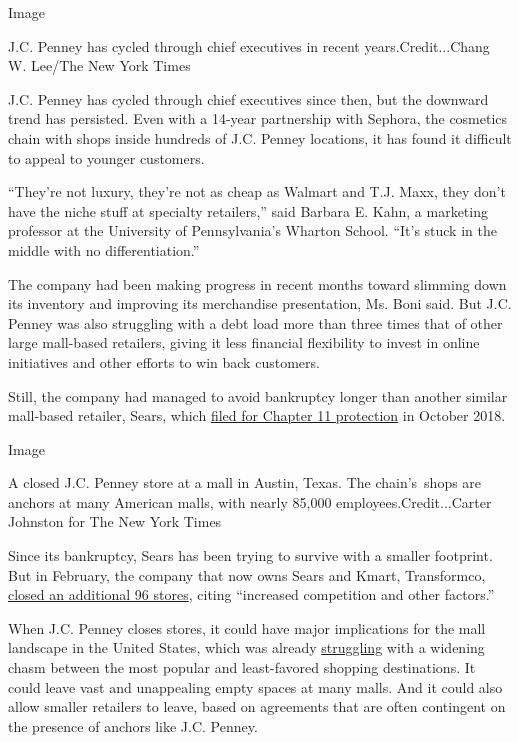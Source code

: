 Image

J.C. Penney has cycled through chief executives in recent
years.Credit...Chang W. Lee/The New York Times

J.C. Penney has cycled through chief executives since then, but the
downward trend has persisted. Even with a 14-year partnership with
Sephora, the cosmetics chain with shops inside hundreds of J.C. Penney
locations, it has found it difficult to appeal to younger customers.

``They're not luxury, they're not as cheap as Walmart and T.J. Maxx,
they don't have the niche stuff at specialty retailers,'' said Barbara
E. Kahn, a marketing professor at the University of Pennsylvania's
Wharton School. ``It's stuck in the middle with no differentiation.''

The company had been making progress in recent months toward slimming
down its inventory and improving its merchandise presentation, Ms. Boni
said. But J.C. Penney was also struggling with a debt load more than
three times that of other large mall-based retailers, giving it less
financial flexibility to invest in online initiatives and other efforts
to win back customers.

Still, the company had managed to avoid bankruptcy longer than another
similar mall-based retailer, Sears, which
\href{https://www.nytimes3xbfgragh.onion/2018/10/14/business/sears-bankruptcy-filing-chapter-11.html}{filed
for Chapter 11 protection} in October 2018.

Image

A closed J.C. Penney store at a mall in Austin, Texas. The chain's~shops
are anchors at many American malls, with nearly 85,000
employees.Credit...Carter Johnston for The New York Times

Since its bankruptcy, Sears has been trying to survive with a smaller
footprint. But in February, the company that now owns Sears and Kmart,
Transformco,
\href{https://transformco.com/docs/110719-store-closing-list.pdf}{closed
an additional 96 stores}, citing ``increased competition and other
factors.''

When J.C. Penney closes stores, it could have major implications for the
mall landscape in the United States, which was already
\href{https://www.nytimes3xbfgragh.onion/2017/01/05/business/department-stores-macys-sears.html}{struggling}
with a widening chasm between the most popular and least-favored
shopping destinations. It could leave vast and unappealing empty spaces
at many malls. And it could also allow smaller retailers to leave, based
on agreements that are often contingent on the presence of anchors like
J.C. Penney.

